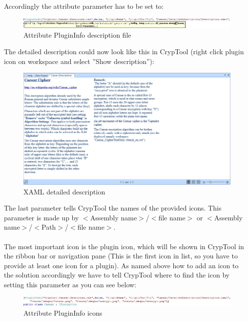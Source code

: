 Accordingly the attribute parameter has to be set to:
\begin{figure}[h!]
	\centering
		\includegraphics[width=1.00\textwidth]{figures/attribute_plugininfo_detailed_descr.jpg}
	\caption{Attribute PluginInfo description file}
	\label{fig:attribute_plugininfo_icon}
\end{figure}

The detailed description could now look like this in CrypTool (right click plugin icon on workspace and select ''Show description''):\clearpage
\begin{figure}[h!]
	\centering
		\includegraphics[width=1.00\textwidth]{figures/xaml_description.jpg}
	\caption{XAML detailed description}
	\label{fig:xaml_description}
\end{figure}

The last parameter tells CrypTool the names of the provided icons. This parameter is made up by $<$Assembly name$>$/$<$file name$>$ or $<$Assembly name$>$/$<$Path$>$/$<$file name$>$.\\\\
The most important icon is the plugin icon, which will be shown in CrypTool in the ribbon bar or navigation pane (This is the first icon in list, so you have to provide at least one icon for a plugin). As named above how to add an icon to the solution accordingly we have to tell CrypTool where to find the icon by setting this parameter as you can see below:
\begin{figure}[h!]
	\centering
		\includegraphics[width=1.00\textwidth]{figures/attribute_plugininfo_icons.jpg}
	\caption{Attribute PluginInfo icons}
	\label{fig:attribute_plugininfo_icons}
\end{figure}

